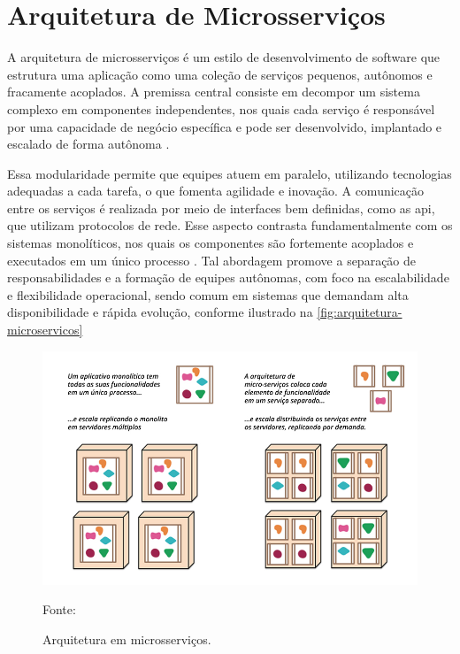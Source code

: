 \section{Arquitetura de Microsserviços}

A arquitetura de microsserviços é um estilo de desenvolvimento de software que estrutura uma aplicação como uma coleção de serviços pequenos, autônomos e fracamente acoplados. A premissa central consiste em decompor um sistema complexo em componentes independentes, nos quais cada serviço é responsável por uma capacidade de negócio específica e pode ser desenvolvido, implantado e escalado de forma autônoma \cite{newman_building_2022,fowler_microsservicos_2022}.

Essa modularidade permite que equipes atuem em paralelo, utilizando tecnologias adequadas a cada tarefa, o que fomenta agilidade e inovação. A comunicação entre os serviços é realizada por meio de interfaces bem definidas, como as \acrfull{api}, que utilizam protocolos de rede. Esse aspecto contrasta fundamentalmente com os sistemas monolíticos, nos quais os componentes são fortemente acoplados e executados em um único processo \cite{lewis_microservices_2014}. Tal abordagem promove a separação de responsabilidades e a formação de equipes autônomas, com foco na escalabilidade e flexibilidade operacional, sendo comum em sistemas que demandam alta disponibilidade e rápida evolução, conforme ilustrado na \autoref{fig:arquitetura-microservicos}

\begin{figure}[H]
    \caption{Arquitetura em microsserviços.}
    \label{fig:arquitetura-microservicos}
    \centering
    \includegraphics[width=0.8\linewidth]{imagens/1-arquitetura-microsservicos-fowler.png}    
    {\par \raggedright \footnotesize Fonte: \textcite{fowler_microsservicos_2022}\par}
\end{figure}


